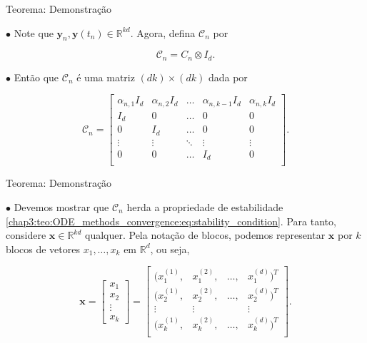 \documentclass{beamer}
\newcommand{\R}{\mathbb{R}}
\theoremstyle{plain}
\theoremstyle{definition}
\begin{document}
\begin{frame}{Teorema: Demonstração}
    
    \phantom{aa} $\bullet$ Note que $\mathbf{y}_n, \mathbf{y}(t_n) \in \R^{kd}$. Agora, defina \(\mathcal{C}_{n}\) por

    \[
      \mathcal{C}_{n}=C_{n} \otimes I_{d}.
    \]

    \noindent
    \phantom{aa} $\bullet$  Então que $\mathcal{C}_{n}$ é uma matriz $(dk)\times(dk)$ dada por

    \[
      \mathcal{C}_{n}  = 
      \begin{bmatrix}
        \alpha_{n,1} I_d & \alpha_{n,2} I_d & \dots & \alpha_{n, k-1} I_d & \alpha_{n, k} I_d \\
        I_d & 0 & \dots & 0 & 0 \\
        0 & I_d & \dots & 0 & 0 \\
        \vdots & \vdots & \ddots & \vdots & \vdots \\
        0 & 0 & \dots & I_d & 0 \\
      \end{bmatrix}.
    \]

\end{frame}



\begin{frame}{Teorema: Demonstração}
    
    \phantom{aa} $\bullet$ Devemos mostrar que $\mathcal{C}_n$ herda a propriedade de estabilidade \eqref{chap3:teo:ODE_methods_convergence:eq:stability_condition}. Para tanto, considere $\mathbf{x} \in \R^{kd}$ qualquer. Pela notação de blocos, podemos representar $\mathbf{x}$ por $k$ blocos de vetores $x_1, \dots, x_k$  em $\R^d$, ou seja,

  \[
    \mathbf{x} = 
    \begin{bmatrix}
      x_1 \\
      x_2 \\
      \vdots \\
      x_k
    \end{bmatrix}
    =
    \begin{bmatrix}
      (x_{1}^{(1)} ,& x_{1}^{(2)} ,& \dots ,&x_{1}^{(d)})^T \\
      (x_{2}^{(1)} ,& x_{2}^{(2)} ,& \dots ,&x_{2}^{(d)})^T \\
      \vdots & \vdots  &\phantom{\dots} &\vdots \\
      (x_{k}^{(1)} ,& x_{k}^{(2)} ,& \dots ,&x_{k}^{(d)})^T \\
    \end{bmatrix}.
  \]
\end{frame}
\end{document}

